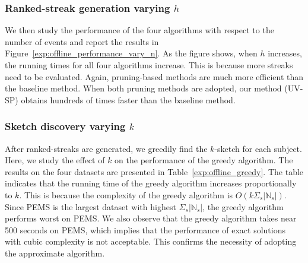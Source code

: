 \subsubsection{Ranked-streak generation varying $h$}
We then study the performance of the four algorithms with respect to the number of events and report the results 
in Figure~\ref{exp:offline_performance_vary_n}. As the figure shows, when $h$ increases, 
the running times for all four algorithms increase. This is because more streaks need to be evaluated. 
Again, pruning-based methods are much more efficient than the baseline method. When both pruning methods are adopted, our method (UV-SP) obtains hundreds of times faster than the baseline method.

%

\subsubsection{Sketch discovery varying $k$}
After ranked-streaks are generated, we greedily find the $k$-sketch for each subject. 
Here, we study the effect of $k$ on the performance of the greedy algorithm. The results on the four datasets are presented in Table~\ref{exp:offline_greedy}. The table indicates that the running time of the greedy algorithm 
increases proportionally to $k$.
%
This is because the complexity of the greedy algorithm is $O(k\Sigma_s|\mathbb{N}_s|)$. Since PEMS is the largest dataset with highest $\Sigma_s|\mathbb{N}_s|$, the greedy algorithm performs worst on PEMS. We also observe that the greedy algorithm takes near 500 seconds on PEMS, which implies that the performance of exact solutions with cubic complexity is not acceptable. This confirms the necessity of adopting the approximate algorithm.

